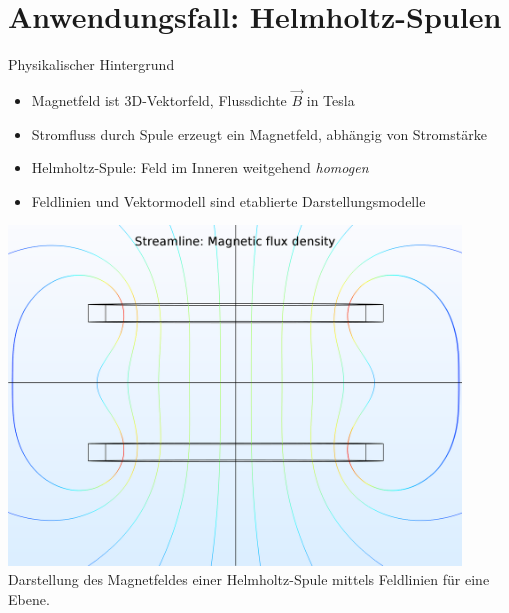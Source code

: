 \part{Anwendungsfall: Helmholtz-Spulen}
\label{part:physics}
\begin{frame}[fragile]{Physikalischer Hintergrund}
\begin{minipage}{0.5\textwidth}
	{
		\begin{itemize}[itemsep=1mm]
			\item Magnetfeld ist 3D-Vektorfeld, Flussdichte $\vec{B}$ in Tesla
			\item Stromfluss durch Spule erzeugt ein Magnetfeld, abhängig von Stromstärke
			\item Helmholtz-Spule: Feld im Inneren weitgehend \textit{homogen}
			\item Feldlinien und Vektormodell sind etablierte Darstellungsmodelle
		\end{itemize}
	}
\end{minipage}
\begin{minipage}{0.45\textwidth}
	\centering
	\includegraphics[width=0.9\textwidth]{images/papers/hh_mfield.png}\\
	\small Darstellung des Magnetfeldes einer Helmholtz-Spule mittels Feldlinien für eine Ebene.
\end{minipage}
\end{frame}
